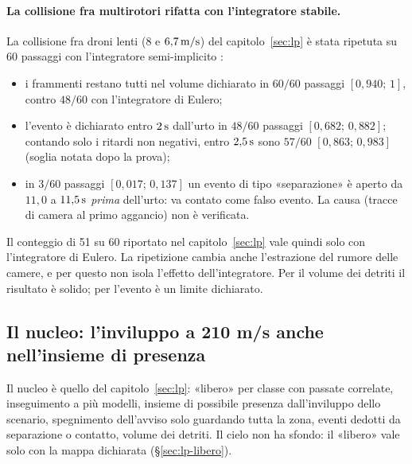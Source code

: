 \paragraph{La collisione fra multirotori rifatta con l'integratore stabile.} La collisione fra droni lenti ($8$ e $6{,}7\,\mathrm{m/s}$) del capitolo~\ref{sec:lp} è stata ripetuta su 60 passaggi con l'integratore semi-implicito :
\begin{itemize}
\item i frammenti restano tutti nel volume dichiarato in $60/60$ passaggi $[0{,}940;\,1]$, contro $48/60$ con l'integratore di Eulero;
\item l'evento è dichiarato entro $2\,\mathrm{s}$ dall'urto in $48/60$ passaggi $[0{,}682;\,0{,}882]$; contando solo i ritardi non negativi, entro $2{,}5\,\mathrm{s}$ sono $57/60$ $[0{,}863;\,0{,}983]$ (soglia notata dopo la prova);
\item in $3/60$ passaggi $[0{,}017;\,0{,}137]$ un evento di tipo «separazione» è aperto da $11{,}0$ a $11{,}5\,\mathrm{s}$ \emph{prima} dell'urto: va contato come falso evento. La causa (tracce di camera al primo aggancio) non è verificata.
\end{itemize}
Il conteggio di 51 su 60 riportato nel capitolo~\ref{sec:lp} vale quindi solo con l'integratore di Eulero. La ripetizione cambia anche l'estrazione del rumore delle camere, e per questo non isola l'effetto dell'integratore. Per il volume dei detriti il risultato è solido; per l'evento è un limite dichiarato.

\subsection{Il nucleo: l'inviluppo a 210 m/s anche nell'insieme di presenza}\label{sec:vo-nucleo}

Il nucleo è quello del capitolo~\ref{sec:lp}: «libero» per classe con passate correlate, inseguimento a più modelli, insieme di possibile presenza dall'inviluppo dello scenario, spegnimento dell'avviso solo guardando tutta la zona, eventi dedotti da separazione o contatto, volume dei detriti. Il cielo non ha sfondo: il «libero» vale solo con la mappa dichiarata (\S\ref{sec:lp-libero}).

